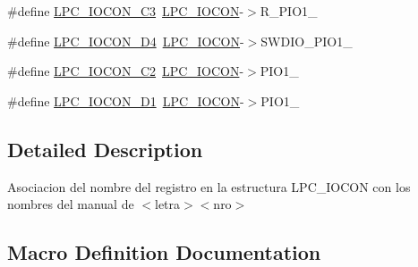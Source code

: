 \begin{DoxyCompactItemize}
\item 
\#define \hyperlink{group___l_p_c___i_o_c_o_n___l_p_c1102___a_s_o_c_i_a_c_i_o_n_e_s_ga285291cb7f4f7bae6c08f7a6ca2885a2}{L\+P\+C\+\_\+\+I\+O\+C\+O\+N\+\_\+\+C3}~\hyperlink{group___l_p_c11xx___definitions_gaabc651799ba17b0dd4a0114c8d48a145}{L\+P\+C\+\_\+\+I\+O\+C\+ON}-\/$>$R\+\_\+\+P\+I\+O1\+\_
\item 
\#define \hyperlink{group___l_p_c___i_o_c_o_n___l_p_c1102___a_s_o_c_i_a_c_i_o_n_e_s_ga25bed3139a10eb803a6e2e017fa255f9}{L\+P\+C\+\_\+\+I\+O\+C\+O\+N\+\_\+\+D4}~\hyperlink{group___l_p_c11xx___definitions_gaabc651799ba17b0dd4a0114c8d48a145}{L\+P\+C\+\_\+\+I\+O\+C\+ON}-\/$>$S\+W\+D\+I\+O\+\_\+\+P\+I\+O1\+\_
\item 
\#define \hyperlink{group___l_p_c___i_o_c_o_n___l_p_c1102___a_s_o_c_i_a_c_i_o_n_e_s_ga73459d08b19f5790fa4f7514108d515b}{L\+P\+C\+\_\+\+I\+O\+C\+O\+N\+\_\+\+C2}~\hyperlink{group___l_p_c11xx___definitions_gaabc651799ba17b0dd4a0114c8d48a145}{L\+P\+C\+\_\+\+I\+O\+C\+ON}-\/$>$P\+I\+O1\+\_
\item 
\#define \hyperlink{group___l_p_c___i_o_c_o_n___l_p_c1102___a_s_o_c_i_a_c_i_o_n_e_s_gae3021c481ea6e4bf372e5cd17e118f37}{L\+P\+C\+\_\+\+I\+O\+C\+O\+N\+\_\+\+D1}~\hyperlink{group___l_p_c11xx___definitions_gaabc651799ba17b0dd4a0114c8d48a145}{L\+P\+C\+\_\+\+I\+O\+C\+ON}-\/$>$P\+I\+O1\+\_
\end{DoxyCompactItemize}


\subsection{Detailed Description}
Asociacion del nombre del registro en la estructura L\+P\+C\+\_\+\+I\+O\+C\+ON con los nombres del manual de $<$letra$>$$<$nro$>$ 



\subsection{Macro Definition Documentation}

